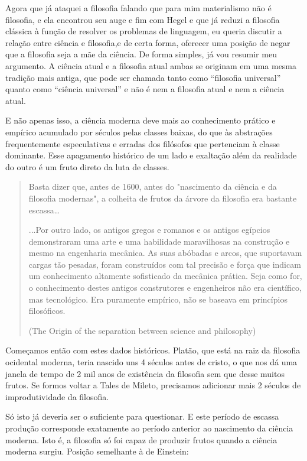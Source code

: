 Agora que já ataquei a filosofia falando que para mim materialismo não é filosofia, e ela encontrou seu auge e fim com Hegel e que já reduzi a filosofia clássica à função de resolver os problemas de linguagem, eu queria discutir a relação entre ciência e filosofia,e de certa forma, oferecer uma posição de negar que a filosofia seja a mãe da ciência. De forma simples, já vou resumir meu argumento. A ciência atual e a filosofia atual ambas se originam em uma mesma tradição mais antiga, que pode ser chamada tanto como “filosofia universal” quanto como “ciência universal” e não é nem a filosofia atual e nem a ciência atual.

E não apenas isso, a ciência moderna deve mais ao conhecimento prático e empírico acumulado por séculos pelas classes baixas, do que às abstrações frequentemente especulativas e erradas dos filósofos que pertenciam à classe dominante. Esse apagamento histórico de um lado e exaltação além da realidade do outro é um fruto direto da luta de classes.

\begin{quote}
Basta dizer que, antes de 1600, antes do "nascimento da ciência e da filosofia modernas", a colheita de frutos da árvore da filosofia era bastante escassa…

...Por outro lado, os antigos gregos e romanos e os antigos egípcios demonstraram uma arte e uma habilidade maravilhosas na construção e mesmo na engenharia mecânica. As suas abóbadas e arcos, que suportavam cargas tão pesadas, foram construídos com tal precisão e força que indicam um conhecimento altamente sofisticado da mecânica prática. Seja como for, o conhecimento destes antigos construtores e engenheiros não era científico, mas tecnológico. Era puramente empírico, não se baseava em princípios filosóficos.

(The Origin of the separation between science and philosophy)
\end{quote}

Começamos então com estes dados históricos. Platão, que está na raiz da filosofia ocidental moderna, teria nascido uns 4 séculos antes de cristo, o que nos dá uma janela de tempo de 2 mil anos de existência da filosofia sem que desse muitos frutos. Se formos voltar a Tales de Mileto, precisamos adicionar mais 2 séculos de improdutividade da filosofia.

Só isto já deveria ser o suficiente para questionar.  E este período de escassa produção corresponde exatamente ao período anterior ao nascimento da ciência moderna. Isto é, a filosofia só foi capaz de produzir frutos quando a ciência moderna surgiu. Posição semelhante à de Einstein:

